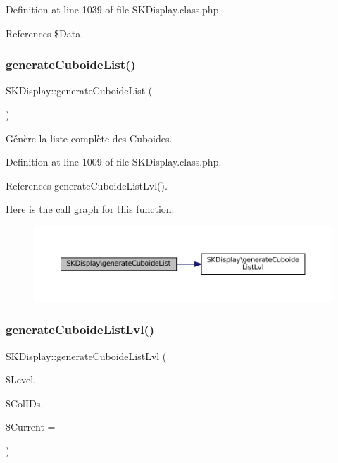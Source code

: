 Definition at line 1039 of file S\+K\+Display.\+class.\+php.



References \$\+Data.

\mbox{\label{class_s_k_display_a8eef090fc6b4a4ccf166dae15ae8f5d0}} 
\subsubsection{\texorpdfstring{generate\+Cuboide\+List()}{generateCuboideList()}}
{\footnotesize\ttfamily S\+K\+Display\+::generate\+Cuboide\+List (\begin{DoxyParamCaption}{ }\end{DoxyParamCaption})\hspace{0.3cm}{\ttfamily [protected]}}

Génère la liste complète des Cuboides. 

Definition at line 1009 of file S\+K\+Display.\+class.\+php.



References generate\+Cuboide\+List\+Lvl().

Here is the call graph for this function\+:\nopagebreak
\begin{figure}[H]
\begin{center}
\leavevmode
\includegraphics[width=350pt]{class_s_k_display_a8eef090fc6b4a4ccf166dae15ae8f5d0_cgraph}
\end{center}
\end{figure}
\mbox{\label{class_s_k_display_a68016a979e2653d960751913fe9d656a}} 
\subsubsection{\texorpdfstring{generate\+Cuboide\+List\+Lvl()}{generateCuboideListLvl()}}
{\footnotesize\ttfamily S\+K\+Display\+::generate\+Cuboide\+List\+Lvl (\begin{DoxyParamCaption}\item[{}]{\$\+Level,  }\item[{}]{\$\+Col\+I\+Ds,  }\item[{}]{\$\+Current = {\ttfamily \textquotesingle{}\textquotesingle{}} }\end{DoxyParamCaption})\hspace{0.3cm}{\ttfamily [protected]}}

